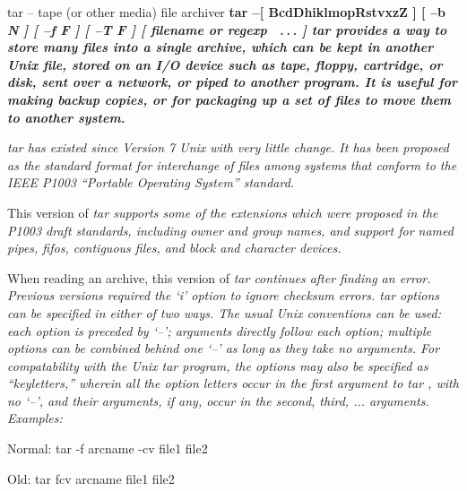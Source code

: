 


%
%

tar -- tape (or other media) file archiver
%
\bf tar \rm%
 --[%
\bf BcdDhiklmopRstvxzZ\rm%
]
[%
\bf --b \rm%
\it N\rm%
]
[%
\bf --f \rm%
\it F\rm%
]
[%
\bf --T \rm%
\it F\rm%
]
[ %
\it filename or regexp\rm%
\, .\,.\,.  ]
%
\it tar \rm%
 provides a way to store many files into a single archive,
which can be kept in another Unix file, stored on an I/O device
such as tape, floppy, cartridge, or disk, sent over a network, or piped to
another program.
It is useful for making backup copies, or for packaging up a set of
files to move them to another system.
\par\noindent
%
\it tar \rm%
 has existed since Version 7 Unix with very little change.
It has been proposed as the standard format for interchange of files
among systems that conform to the IEEE P1003 ``Portable Operating System''
standard.
\par\noindent
This version of %
\it tar \rm%
 supports some of the extensions which
were proposed in the P1003 draft standards, including owner and group
names, and support for named pipes, fifos, contiguous files,
and block and character devices.
\par\noindent
When reading an archive, this version of %
\it tar \rm%
 continues after
finding an error.  Previous versions required the `i' option to ignore
checksum errors.
%
\it tar \rm%
 options can be specified in either of two ways.  The usual
Unix conventions can be used: each option is preceded by `--'; arguments
directly follow each option; multiple options can be combined behind one `--'
as long as they take no arguments.  For compatability with the Unix
%
\it tar \rm%
 program, the options may also be specified as ``keyletters,''
wherein all the option letters occur in the first argument to %
\it tar\rm%
,
with no `--', and their arguments, if any, occur in the second, third, ...
arguments.  Examples:
\par\noindent
Normal:  tar -f arcname -cv file1 file2
\par\noindent
Old:  tar fcv arcname file1 file2
